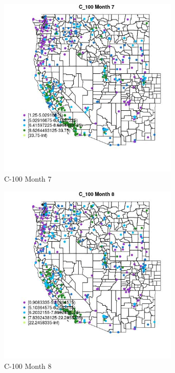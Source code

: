 \begin{figure} 
\centering  
\includegraphics[width=0.77\textwidth]{Code_Outputs/ML_input_report_ML_input_PM25_Step5_part_d_de_duplicated_aves_ML_input_MapObsMo7C_100.jpg} 
\caption{\label{fig:ML_input_report_ML_input_PM25_Step5_part_d_de_duplicated_aves_ML_inputMapObsMo7C_100}C-100 Month 7} 
\end{figure} 
 

\begin{figure} 
\centering  
\includegraphics[width=0.77\textwidth]{Code_Outputs/ML_input_report_ML_input_PM25_Step5_part_d_de_duplicated_aves_ML_input_MapObsMo8C_100.jpg} 
\caption{\label{fig:ML_input_report_ML_input_PM25_Step5_part_d_de_duplicated_aves_ML_inputMapObsMo8C_100}C-100 Month 8} 
\end{figure} 
 

